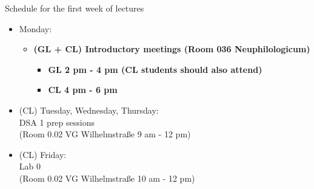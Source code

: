 \documentclass[aspectratio=169,hyperref={unicode},xcolor={dvipsnames}]{beamer}
\begin{document}
\begin{frame}{Schedule for the first week of lectures}
\begin{itemize}
	\item Monday: 
		\begin{itemize}
		\item \textbf{(GL + CL) Introductory meetings (Room 036 Neuphilologicum)}
		\begin{itemize}
			\item \textbf{GL 2 pm - 4 pm (CL students should also attend)}
			\item \textbf{CL 4 pm - 6 pm}
		\end{itemize}
		\end{itemize}
	\item (CL) Tuesday, Wednesday, Thursday: \\ DSA 1 prep sessions \\(Room 0.02 VG Wilhelmstraße 9 am - 12 pm)
	\item (CL) Friday: \\Lab 0 \\(Room 0.02 VG Wilhelmstraße 10 am - 12 pm)
	
\end{itemize}
\end{frame}
\end{document}
